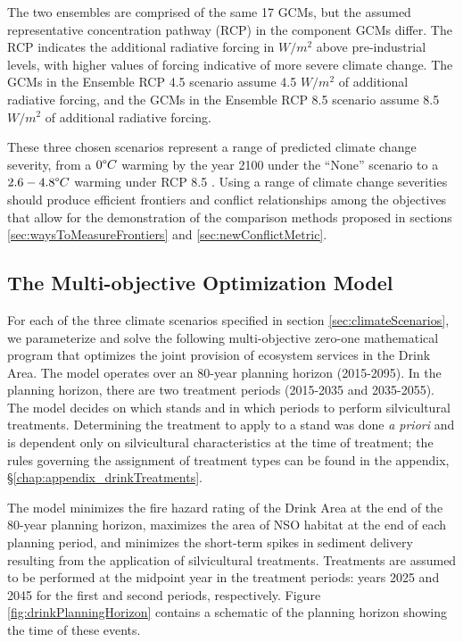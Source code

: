 The two ensembles are comprised of the same 17 GCMs, but the assumed representative concentration pathway (RCP) in the component GCMs differ. The RCP indicates the additional radiative forcing in $W/m^2$ above pre-industrial levels, with higher values of forcing indicative of more severe climate change. The GCMs in the Ensemble RCP 4.5 scenario assume 4.5 $W/m^2$ of additional radiative forcing, and the GCMs in the Ensemble RCP 8.5 scenario assume 8.5 $W/m^2$ of additional radiative forcing.

These three chosen scenarios represent a range of predicted climate change severity, from a $0 \degree C$ warming by the year 2100 under the ``None'' scenario to a $2.6-4.8 \degree C$ warming under RCP 8.5 \cite{ipcc2013climate}. Using a range of climate change severities should produce efficient frontiers and conflict relationships among the objectives that allow for the demonstration of the comparison methods proposed in sections \ref{sec:waysToMeasureFrontiers} and \ref{sec:newConflictMetric}.

\subsection{The Multi-objective Optimization Model}
\label{sec:model}
For each of the three climate scenarios specified in section \ref{sec:climateScenarios}, we parameterize and solve the following multi-objective zero-one mathematical program that optimizes the joint provision of ecosystem services in the Drink Area. The model operates over an 80-year planning horizon (2015-2095). In the planning horizon, there are two treatment periods (2015-2035 and 2035-2055). The model decides on which stands and in which periods to perform silvicultural treatments. Determining the treatment to apply to a stand was done \textit{a priori} and is dependent only on silvicultural characteristics at the time of treatment; the rules governing the assignment of treatment types can be found in the appendix, \S \ref{chap:appendix_drinkTreatments}.

The model minimizes the fire hazard rating of the Drink Area at the end of the 80-year planning horizon, maximizes the area of NSO habitat at the end of each planning period, and minimizes the short-term spikes in sediment delivery resulting from the application of silvicultural treatments. Treatments are assumed to be performed at the midpoint year in the treatment periods: years 2025 and 2045 for the first and second periods, respectively. Figure \ref{fig:drinkPlanningHorizon} contains a schematic of the planning horizon showing the time of these events.

